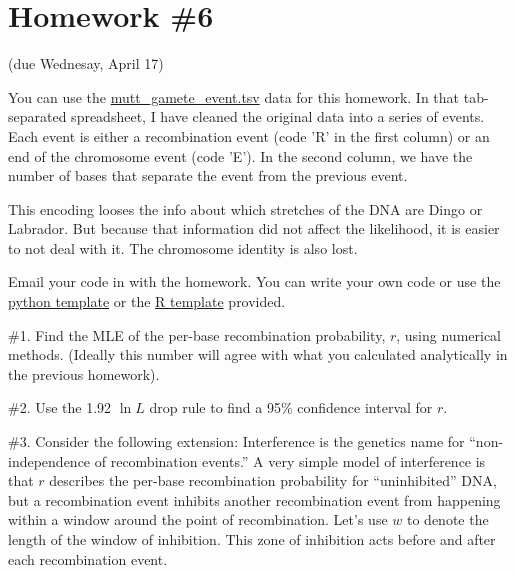 \documentclass[11pt]{article}
\newcommand{\href}[2]{\url{#2}}
\begin{document}
\section*{Homework \#6} (due Wednesay, April 17)

You can use the \href{https://github.com/mtholder/likelihood-methods-course-2019/raw/master/homework/mutt_gamete_event.tsv}{mutt_gamete_event.tsv} data for this
homework.
In that tab-separated spreadsheet, I have cleaned the 
    original data into a series of events.
Each event is either a recombination event (code 'R' 
    in the first column) or an end of the chromosome
    event (code 'E').
In the second column, we have the number of bases
    that separate the event from the previous
    event.

This encoding looses the info about which stretches of the
    DNA are Dingo or Labrador.
But because that information did not affect the likelihood,
    it is easier to not deal with it.
The chromosome identity is also lost.


Email your code in with the homework.
You can write your own code or use the 
    \href{https://github.com/mtholder/likelihood-methods-course-2019/blob/master/homework/hw6-template.py}{python template}
or the 
    \href{https://github.com/mtholder/likelihood-methods-course-2019/blob/master/homework/hw6-template.R}{R template} provided.

\#1. Find the MLE of the per-base recombination probability, $r$, using
numerical methods.
    (Ideally this number will agree with what you calculated analytically
    in the previous homework).


\#2. Use the 1.92 $\ln L$ drop rule to find a 95\% confidence interval
    for $r$.

\#3. Consider the following extension:
Interference is the genetics name for ``non-independence of recombination
    events.''
A very simple model of interference is that 
    $r$ describes the per-base recombination probability for ``uninhibited''
    DNA, but a recombination event inhibits another recombination event
    from happening within a window around the point of recombination.
Let's use $w$ to denote the length of the window of inhibition.
This zone of inhibition acts before and after each recombination event.
\end{document}
